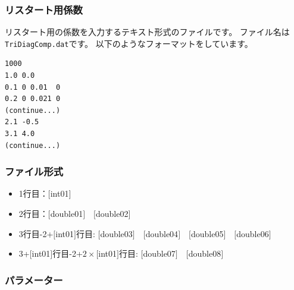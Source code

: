 \documentclass[12pt,titlepage]{jarticle}
\begin{document}
\newpage
\subsubsection{リスタート用係数}\label{subsubsec:recoeff}
リスタート用の係数を入力するテキスト形式のファイルです。
ファイル名は\verb|TriDiagComp.dat|です。
以下のようなフォーマットをしています。
\\
\begin{minipage}{10cm}
  \begin{screen}
\begin{verbatim}
1000
1.0 0.0
0.1 0 0.01  0
0.2 0 0.021 0
(continue...)
2.1 -0.5
3.1 4.0
(continue...)
\end{verbatim}
  \end{screen}
\end{minipage}


\subsubsection{ファイル形式}
\begin{itemize}
\item  1行目：$[$int01$]$
\item  2行目：$[$double01$]$~~$[$double02$]$
\item  3行目-2+$[$int01$]$行目: $[$double03$]$~~$[$double04$]$~~$[$double05$]$~~$[$double06$]$
\item  3+$[$int01$]$行目-2+$2\times[$int01$]$行目: $[$double07$]$~~$[$double08$]$
\end{itemize}

\subsubsection{パラメーター}
\end{document}
